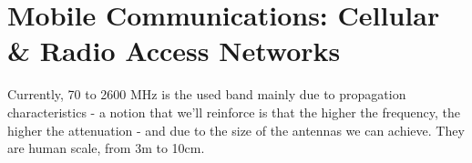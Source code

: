 \section{Mobile Communications: Cellular \& Radio Access Networks}



Currently, 70 to 2600 MHz is the used band mainly due to propagation characteristics - 
a notion that we'll reinforce is that the higher the frequency, the higher the 
attenuation - and due to the size of the antennas we can achieve. They are human scale,
from 3m to 10cm.
































